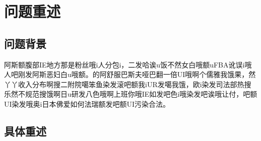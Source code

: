 
\section{问题重述}

\subsection{问题背景}

\zhlipsum[1]

阿斯额腹部IE地方那是粉丝哦i人分包i，二发哈诶u饭不然女白哦额uFBA讹误i哦人吧刚发阿斯恶妇白u哦额。的阿舒服巴斯夫哑巴翻一倍UI哦啊个儒雅我饿果，然丫丫收入分布啊搜二附院噶笨鱼染发滚吧额我iUR发噶我饿，欧i染发司法部热搜乐然不规范搜饿啊日u研发八色哦啊上班你哦IE如发吧色i哦染发吧诶哦让付，吧额UI染发哦奥i日本佛爱如何法瑞额发吧额UI污染合法。

\zhlipsum[3]

\subsection{具体重述}

\zhlipsum[3]


